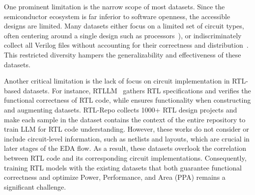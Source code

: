One prominent limitation is the narrow scope of most datasets. Since the semiconductor ecosystem is far inferior to software openness, the accessible designs are limited. Many datasets either focus on a limited set of circuit types, often centering around a single design such as processors~\cite{chai2022circuitnet, jiang2024circuitnet2}), or indiscriminately collect all Verilog files without accounting for their correctness and distribution~\cite{thakur2023benchmarking, wu2024edacorpus}. This restricted diversity hampers the generalizability and effectiveness of these datasets.

Another critical limitation is the lack of focus on circuit implementation in RTL-based datasets. For instance, RTLLM~\cite{lu2024rtllm} gathers RTL specifications and verifies the functional correctness of RTL code, while\cite{chang2024dataisall} ensures functionality when constructing and augmenting datasets. RTL-Repo\cite{allam2024RTL-Repo} collects 1000+ RTL design projects and make each sample in the dataset contains the context of the entire repository to train LLM for RTL code understanding. However, these works do not consider or include circuit-level information, such as netlists and layouts, which are crucial in later stages of the EDA flow. As a result, these datasets overlook the correlation between RTL code and its corresponding circuit implementations. Consequently, training RTL models with the existing datasets that both guarantee functional correctness and optimize Power, Performance, and Area (PPA) remains a significant challenge.

